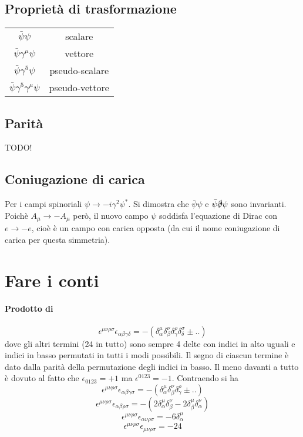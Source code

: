 \documentclass[12pt,a4paper]{article}
\begin{document}
	\subsection{Proprietà di trasformazione}
	\begin{tabular}{|c|c|}
		$\bar{\psi}\psi$&scalare  \\ 
		$\bar{\psi}\gamma^\mu\psi$&vettore  \\ 
		$\bar{\psi}\gamma^5\psi$&pseudo-scalare  \\  
		$\bar{\psi}\gamma^5\gamma^\mu\psi$&pseudo-vettore  \\  
	\end{tabular} 
	
	\subsection{Parità}
	TODO!
	
	\subsection{Coniugazione di carica}
	Per i campi spinoriali $\psi\rightarrow -i \gamma^2 \psi^*$. Si dimostra che $\bar{\psi} \psi$ e $\bar{\psi} \slashed{\partial} \psi$ sono invarianti. Poichè $A_\mu\rightarrow -A_\mu$ però, il nuovo campo $\psi$ soddisfa l'equazione di Dirac con $e\rightarrow-e$, cioè è un campo con carica opposta (da cui il nome coniugazione di carica per questa simmetria).
	
	\section{Fare i conti}
	\paragraph{Prodotto di \epsilon}
	\[ \epsilon^{\mu\nu\rho\sigma} \epsilon_{\alpha\beta\gamma\delta} = -(\delta^\mu_\alpha\delta^\nu_\beta\delta^\rho_\gamma\delta^\sigma_\delta \pm ..) \]
	dove gli altri termini (24 in tutto) sono sempre 4 delte con indici in alto uguali e indici in basso permutati in tutti i modi possibili. Il segno di ciascun termine è dato dalla parità della permutazione degli indici in basso. Il meno davanti a tutto è dovuto al fatto che $\epsilon_{0123}=+1$ ma $\epsilon^{0123}=-1$. Contraendo si ha
	\[ \epsilon^{\mu\nu\rho\sigma}\epsilon_{\alpha\beta\gamma\sigma} =-( \delta^\mu_\alpha\delta^\nu_\beta\delta^\rho_\gamma \pm ..) \]
	\[ \epsilon^{\mu\nu\rho\sigma}\epsilon_{\alpha\beta\rho\sigma} = -(2\delta^\mu_\alpha\delta^\nu_\beta - 2\delta^\mu_\beta\delta^\nu_\alpha) \]
	\[ \epsilon^{\mu\nu\rho\sigma}\epsilon_{\alpha\nu\rho\sigma} = -6\delta^\mu_\alpha \]
	\[ \epsilon^{\mu\nu\rho\sigma}\epsilon_{\mu\nu\rho\sigma} = -24 \]
	
\end{document}
